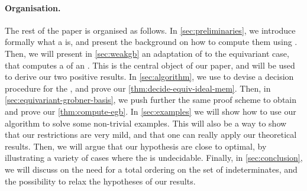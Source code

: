 \paragraph{Organisation.} \AP The rest of the paper is organised as follows. In
\cref{sec:preliminaries}, we introduce formally what a  is,
and present the background on how to compute them using . Then, we will present in \cref{sec:weakgb} an adaptation of
 to the equivariant case, that computes a  of an . This is the central
object of our paper, and will be used to derive our two positive results. In
\cref{sec:algorithm}, we use  to devise a
decision procedure for the , and prove
our \cref{thm:decide-equiv-ideal-mem}. Then, in
\cref{sec:equivariant-grobner-basis}, we push further the same proof scheme to
obtain  and prove our \cref{thm:compute-egb}. In
\cref{sec:examples} we will show how to use our algorithm to solve some
non-trivial examples. This will also be a way to show that our restrictions are
very mild, and that one can really apply our theoretical results. Then, we will
argue that our hypothesis are close to optimal, by illustrating a variety of
cases where the  is undecidable.
Finally, in \cref{sec:conclusion}, we will discuss on the need for a total
ordering on the set of indeterminates, and the possibility to relax the
hypotheses of our results.

